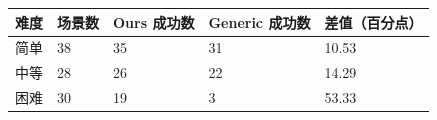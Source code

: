 \begin{tabular}{lllll}
\toprule
难度 & 场景数 & Ours 成功数 & Generic 成功数 & 差值（百分点） \\
\midrule
简单 & 38 & 35 & 31 & 10.53 \\
中等 & 28 & 26 & 22 & 14.29 \\
困难 & 30 & 19 & 3 & 53.33 \\
\bottomrule
\end{tabular}
